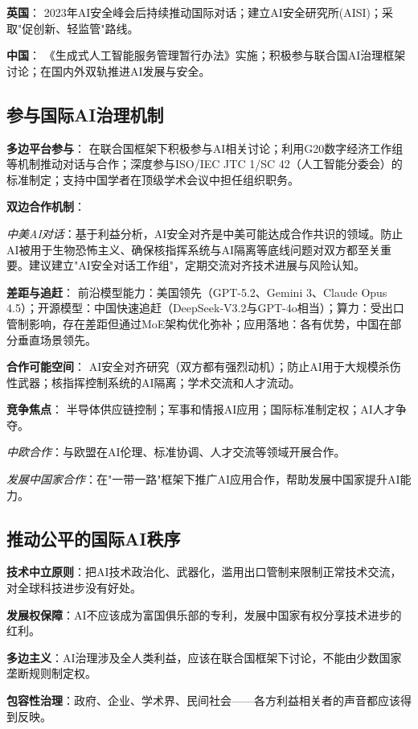 \textbf{英国}：
2023年AI安全峰会后持续推动国际对话；建立AI安全研究所(AISI)；采取"促创新、轻监管"路线。

\textbf{中国}：
《生成式人工智能服务管理暂行办法》实施；积极参与联合国AI治理框架讨论；在国内外双轨推进AI发展与安全。

\subsection{参与国际AI治理机制}

\textbf{多边平台参与}：
在联合国框架下积极参与AI相关讨论；利用G20数字经济工作组等机制推动对话与合作；深度参与ISO/IEC JTC 1/SC 42（人工智能分委会）的标准制定；支持中国学者在顶级学术会议中担任组织职务。

\textbf{双边合作机制}：

\textit{中美AI对话}：基于利益分析，AI安全对齐是中美可能达成合作共识的领域。防止AI被用于生物恐怖主义、确保核指挥系统与AI隔离等底线问题对双方都至关重要。建议建立"AI安全对话工作组"，定期交流对齐技术进展与风险认知。

\textbf{差距与追赶}：
前沿模型能力：美国领先（GPT-5.2、Gemini 3、Claude Opus 4.5）；开源模型：中国快速追赶（DeepSeek-V3.2与GPT-4o相当）；算力：受出口管制影响，存在差距但通过MoE架构优化弥补；应用落地：各有优势，中国在部分垂直场景领先。

\textbf{合作可能空间}：
AI安全对齐研究（双方都有强烈动机）；防止AI用于大规模杀伤性武器；核指挥控制系统的AI隔离；学术交流和人才流动。

\textbf{竞争焦点}：
半导体供应链控制；军事和情报AI应用；国际标准制定权；AI人才争夺。

\textit{中欧合作}：与欧盟在AI伦理、标准协调、人才交流等领域开展合作。

\textit{发展中国家合作}：在"一带一路"框架下推广AI应用合作，帮助发展中国家提升AI能力。

\subsection{推动公平的国际AI秩序}

\textbf{技术中立原则}：把AI技术政治化、武器化，滥用出口管制来限制正常技术交流，对全球科技进步没有好处。

\textbf{发展权保障}：AI不应该成为富国俱乐部的专利，发展中国家有权分享技术进步的红利。

\textbf{多边主义}：AI治理涉及全人类利益，应该在联合国框架下讨论，不能由少数国家垄断规则制定权。

\textbf{包容性治理}：政府、企业、学术界、民间社会——各方利益相关者的声音都应该得到反映。

